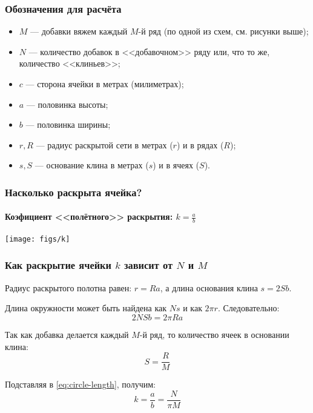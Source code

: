 \begin{frame}
    \frametitle{Обозначения для расчёта}

	\begin{itemize}
		\item $M$ --- добавки вяжем каждый $M$-й ряд (по одной из схем, см. рисунки выше); 
		\item $N$ --- количество добавок в <<добавочном>> ряду или, что то же, количество <<клиньев>>; 
		\item $c$ --- сторона ячейки в метрах (милиметрах);
		\item $a$ --- половинка высоты; 
		\item $b$ --- половинка ширины; 
		\item $r,R$ --- радиус раскрытой сети в метрах ($r$) и в рядах ($R$); 
		\item $s,S$ --- основание клина в метрах ($s$) и в ячеях ($S$).
	\end{itemize}
\end{frame}

\begin{frame}
    \frametitle{Насколько раскрыта ячейка?}
    \framesubtitle{Коэфициент <<полётного>> раскрытия: $k=\frac{a}{b}$}

    \begin{center}
        \texttt{[image: figs/k]}
    \end{center}
\end{frame}

\begin{frame}
    \frametitle{Как раскрытие ячейки $k$ зависит от $N$ и $M$}

	Радиус раскрытого полотна равен: $r=Ra$, а длина основания клина $s=2Sb$.
	
	Длина окружности может быть найдена как $Ns$ и как $2\pi r$. Следовательно:
	\begin{equation}
		\label{eq:circle-length}
		2NSb=2\pi Ra
	\end{equation}
	
	Так как добавка делается каждый $M$-й ряд, то количество ячеек в основании клина:
	\[
		S=\frac{R}{M}
	\]
	
	Подставляя в \eqref{eq:circle-length}, получим:
	\begin{equation}
		\label{eq:k}
		k=\frac{a}{b}=\frac{N}{\pi M}
	\end{equation}
\end{frame}

